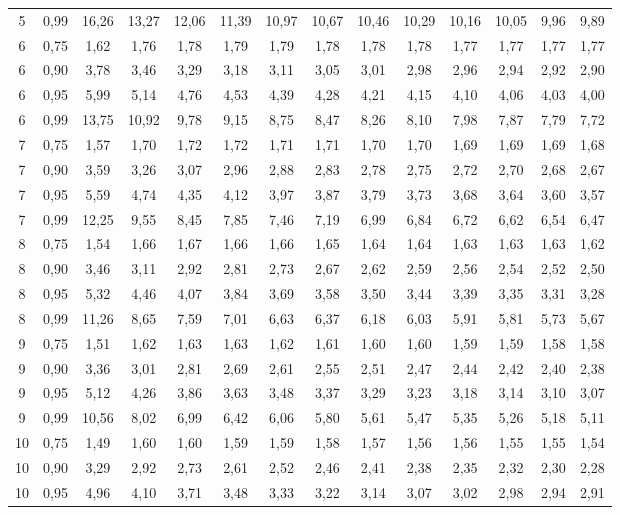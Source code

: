 \documentclass[
]{article}
\begin{document}
\begin{landscape}
\begin{longtable}[t]{cccccccccccccc}
5 & 0,99 & 16,26 & 13,27 & 12,06 & 11,39 & 10,97 & 10,67 & 10,46 & 10,29 & 10,16 & 10,05 & 9,96 & 9,89\\
6 & 0,75 & 1,62 & 1,76 & 1,78 & 1,79 & 1,79 & 1,78 & 1,78 & 1,78 & 1,77 & 1,77 & 1,77 & 1,77\\
6 & 0,90 & 3,78 & 3,46 & 3,29 & 3,18 & 3,11 & 3,05 & 3,01 & 2,98 & 2,96 & 2,94 & 2,92 & 2,90\\
6 & 0,95 & 5,99 & 5,14 & 4,76 & 4,53 & 4,39 & 4,28 & 4,21 & 4,15 & 4,10 & 4,06 & 4,03 & 4,00\\
6 & 0,99 & 13,75 & 10,92 & 9,78 & 9,15 & 8,75 & 8,47 & 8,26 & 8,10 & 7,98 & 7,87 & 7,79 & 7,72\\
7 & 0,75 & 1,57 & 1,70 & 1,72 & 1,72 & 1,71 & 1,71 & 1,70 & 1,70 & 1,69 & 1,69 & 1,69 & 1,68\\
7 & 0,90 & 3,59 & 3,26 & 3,07 & 2,96 & 2,88 & 2,83 & 2,78 & 2,75 & 2,72 & 2,70 & 2,68 & 2,67\\
7 & 0,95 & 5,59 & 4,74 & 4,35 & 4,12 & 3,97 & 3,87 & 3,79 & 3,73 & 3,68 & 3,64 & 3,60 & 3,57\\
7 & 0,99 & 12,25 & 9,55 & 8,45 & 7,85 & 7,46 & 7,19 & 6,99 & 6,84 & 6,72 & 6,62 & 6,54 & 6,47\\
8 & 0,75 & 1,54 & 1,66 & 1,67 & 1,66 & 1,66 & 1,65 & 1,64 & 1,64 & 1,63 & 1,63 & 1,63 & 1,62\\
8 & 0,90 & 3,46 & 3,11 & 2,92 & 2,81 & 2,73 & 2,67 & 2,62 & 2,59 & 2,56 & 2,54 & 2,52 & 2,50\\
8 & 0,95 & 5,32 & 4,46 & 4,07 & 3,84 & 3,69 & 3,58 & 3,50 & 3,44 & 3,39 & 3,35 & 3,31 & 3,28\\
8 & 0,99 & 11,26 & 8,65 & 7,59 & 7,01 & 6,63 & 6,37 & 6,18 & 6,03 & 5,91 & 5,81 & 5,73 & 5,67\\
9 & 0,75 & 1,51 & 1,62 & 1,63 & 1,63 & 1,62 & 1,61 & 1,60 & 1,60 & 1,59 & 1,59 & 1,58 & 1,58\\
9 & 0,90 & 3,36 & 3,01 & 2,81 & 2,69 & 2,61 & 2,55 & 2,51 & 2,47 & 2,44 & 2,42 & 2,40 & 2,38\\
9 & 0,95 & 5,12 & 4,26 & 3,86 & 3,63 & 3,48 & 3,37 & 3,29 & 3,23 & 3,18 & 3,14 & 3,10 & 3,07\\
9 & 0,99 & 10,56 & 8,02 & 6,99 & 6,42 & 6,06 & 5,80 & 5,61 & 5,47 & 5,35 & 5,26 & 5,18 & 5,11\\
10 & 0,75 & 1,49 & 1,60 & 1,60 & 1,59 & 1,59 & 1,58 & 1,57 & 1,56 & 1,56 & 1,55 & 1,55 & 1,54\\
10 & 0,90 & 3,29 & 2,92 & 2,73 & 2,61 & 2,52 & 2,46 & 2,41 & 2,38 & 2,35 & 2,32 & 2,30 & 2,28\\
10 & 0,95 & 4,96 & 4,10 & 3,71 & 3,48 & 3,33 & 3,22 & 3,14 & 3,07 & 3,02 & 2,98 & 2,94 & 2,91\\

\end{longtable}
\end{landscape}
\end{document}
